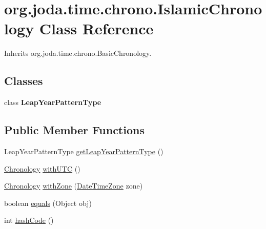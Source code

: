 \hypertarget{classorg_1_1joda_1_1time_1_1chrono_1_1_islamic_chronology}{\section{org.\-joda.\-time.\-chrono.\-Islamic\-Chronology Class Reference}
\label{classorg_1_1joda_1_1time_1_1chrono_1_1_islamic_chronology}
}


Inherits org.\-joda.\-time.\-chrono.\-Basic\-Chronology.

\subsection*{Classes}
\begin{DoxyCompactItemize}
\item 
class {\bfseries Leap\-Year\-Pattern\-Type}
\end{DoxyCompactItemize}
\subsection*{Public Member Functions}
\begin{DoxyCompactItemize}
\item 
Leap\-Year\-Pattern\-Type \hyperlink{classorg_1_1joda_1_1time_1_1chrono_1_1_islamic_chronology_a678202c989b2eb3309fcc7e0e3d4152a}{get\-Leap\-Year\-Pattern\-Type} ()
\item 
\hyperlink{classorg_1_1joda_1_1time_1_1_chronology}{Chronology} \hyperlink{classorg_1_1joda_1_1time_1_1chrono_1_1_islamic_chronology_ac6349212d65c919a98bf09f4cb2007f0}{with\-U\-T\-C} ()
\item 
\hyperlink{classorg_1_1joda_1_1time_1_1_chronology}{Chronology} \hyperlink{classorg_1_1joda_1_1time_1_1chrono_1_1_islamic_chronology_ad17248ceefe5fa88a20987a2c7e2a382}{with\-Zone} (\hyperlink{classorg_1_1joda_1_1time_1_1_date_time_zone}{Date\-Time\-Zone} zone)
\item 
boolean \hyperlink{classorg_1_1joda_1_1time_1_1chrono_1_1_islamic_chronology_a5d27b44758810d8eef767b8c3947aaed}{equals} (Object obj)
\item 
int \hyperlink{classorg_1_1joda_1_1time_1_1chrono_1_1_islamic_chronology_a502195b68d2afa8ca632e26c0238cee7}{hash\-Code} ()
\end{DoxyCompactItemize}
